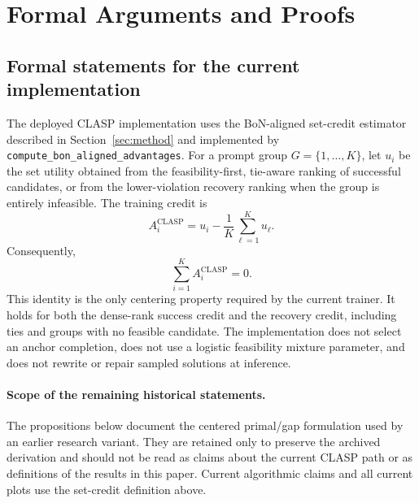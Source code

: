 \documentclass{article}
\theoremstyle{remark}
\begin{document}
\section{Formal Arguments and Proofs}
\label{app:formal}

\subsection{Formal statements for the current implementation}
\label{app:current_formal}
The deployed CLASP implementation uses the BoN-aligned set-credit estimator
described in Section~\ref{sec:method} and implemented by
\texttt{compute\_bon\_aligned\_advantages}. For a prompt group
\(G=\{1,\ldots,K\}\), let \(u_i\) be the set utility obtained from the
feasibility-first, tie-aware ranking of successful candidates, or from the
lower-violation recovery ranking when the group is entirely infeasible. The
training credit is
\[
A_i^{\mathrm{CLASP}} = u_i-\frac{1}{K}\sum_{\ell=1}^K u_\ell .
\]
Consequently,
\[
\sum_{i=1}^K A_i^{\mathrm{CLASP}}=0.
\]
This identity is the only centering property required by the current trainer.
It holds for both the dense-rank success credit and the recovery credit,
including ties and groups with no feasible candidate. The implementation does
not select an anchor completion, does not use a logistic feasibility mixture
parameter, and does not rewrite or repair sampled solutions at inference.

\paragraph{Scope of the remaining historical statements.}
The propositions below document the centered primal/gap formulation used by
an earlier research variant. They are retained only to preserve the archived
derivation and should not be read as claims about the current CLASP path or
as definitions of the results in this paper. Current algorithmic claims and
all current plots use the set-credit definition above.
\end{document}
